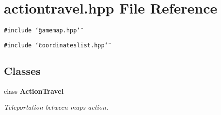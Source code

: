 \section{actiontravel.hpp File Reference}
\label{actiontravel_8hpp}
{\tt \#include \char`\"{}gamemap.hpp\char`\"{}}\par
{\tt \#include \char`\"{}coordinateslist.hpp\char`\"{}}\par
\subsection*{Classes}
\begin{CompactItemize}
\item 
class {\bf Action\-Travel}
\begin{CompactList}\small\item\em Teleportation between maps action. \item\end{CompactList}\end{CompactItemize}
